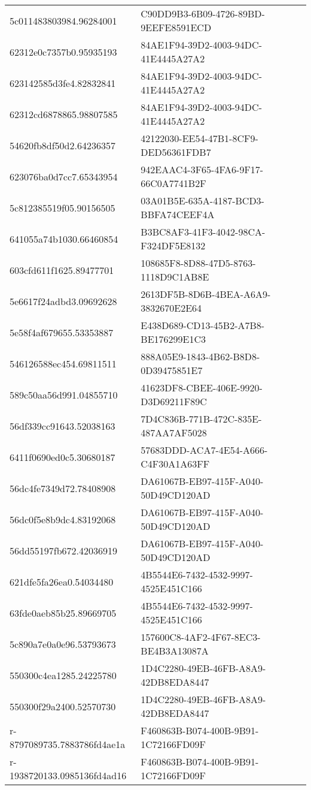 \begin{tabular}{ll}
5c011483803984.96284001 & C90DD9B3-6B09-4726-89BD-9EEFE8591ECD \\
62312e0c7357b0.95935193 & 84AE1F94-39D2-4003-94DC-41E4445A27A2 \\
623142585d3fe4.82832841 & 84AE1F94-39D2-4003-94DC-41E4445A27A2 \\
62312cd6878865.98807585 & 84AE1F94-39D2-4003-94DC-41E4445A27A2 \\
54620fb8df50d2.64236357 & 42122030-EE54-47B1-8CF9-DED56361FDB7 \\
623076ba0d7cc7.65343954 & 942EAAC4-3F65-4FA6-9F17-66C0A7741B2F \\
5c812385519f05.90156505 & 03A01B5E-635A-4187-BCD3-BBFA74CEEF4A \\
641055a74b1030.66460854 & B3BC8AF3-41F3-4042-98CA-F324DF5E8132 \\
603cfd611f1625.89477701 & 108685F8-8D88-47D5-8763-1118D9C1AB8E \\
5e6617f24adbd3.09692628 & 2613DF5B-8D6B-4BEA-A6A9-3832670E2E64 \\
5e58f4af679655.53353887 & E438D689-CD13-45B2-A7B8-BE176299E1C3 \\
546126588ec454.69811511 & 888A05E9-1843-4B62-B8D8-0D39475851E7 \\
589c50aa56d991.04855710 & 41623DF8-CBEE-406E-9920-D3D69211F89C \\
56df339cc91643.52038163 & 7D4C836B-771B-472C-835E-487AA7AF5028 \\
6411f0690ed0c5.30680187 & 57683DDD-ACA7-4E54-A666-C4F30A1A63FF \\
56dc4fe7349d72.78408908 & DA61067B-EB97-415F-A040-50D49CD120AD \\
56dc0f5e8b9dc4.83192068 & DA61067B-EB97-415F-A040-50D49CD120AD \\
56dd55197fb672.42036919 & DA61067B-EB97-415F-A040-50D49CD120AD \\
621dfe5fa26ea0.54034480 & 4B5544E6-7432-4532-9997-4525E451C166 \\
63fde0aeb85b25.89669705 & 4B5544E6-7432-4532-9997-4525E451C166 \\
5c890a7e0a0e96.53793673 & 157600C8-4AF2-4F67-8EC3-BE4B3A13087A \\
550300c4ea1285.24225780 & 1D4C2280-49EB-46FB-A8A9-42DB8EDA8447 \\
550300f29a2400.52570730 & 1D4C2280-49EB-46FB-A8A9-42DB8EDA8447 \\
r-8797089735.7883786fd4ae1a & F460863B-B074-400B-9B91-1C72166FD09F \\
r-1938720133.0985136fd4ad16 & F460863B-B074-400B-9B91-1C72166FD09F \\

\end{tabular}
